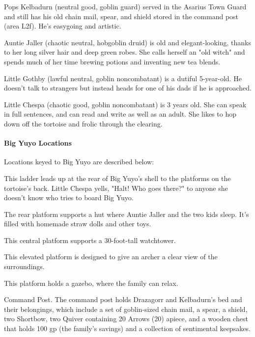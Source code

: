 \documentclass[10pt,a4paper,twoside,bg=print,twocolumn,openany,nodeprecatedcode]{dndbook}
\begin{document}
Pops Kelbadurn (neutral good, goblin guard) served in the Asarius Town Guard and still has his old chain mail, spear, and shield stored in the command post (area L2f). He's easygoing and artistic.

Auntie Jaller (chaotic neutral, hobgoblin druid) is old and elegant-looking, thanks to her long silver hair and deep green robes. She calls herself an "old witch" and spends much of her time brewing potions and inventing new tea blends.

Little Gothby (lawful neutral, goblin noncombatant) is a dutiful 5-year-old. He doesn't talk to strangers but instead heads for one of his dads if he is approached.

Little Chespa (chaotic good, goblin noncombatant) is 3 years old. She can speak in full sentences, and can read and write as well as an adult. She likes to hop down off the tortoise and frolic through the clearing.

\paragraph{Big Yuyo Locations}
Locations keyed to Big Yuyo are described below:


\begin{description}[nolistsep]
\item[L2a: Upladder.]
This ladder leads up at the rear of Big Yuyo's shell to the platforms on the tortoise's back. Little Chespa yells, "Halt! Who goes there?" to anyone she doesn't know who tries to board Big Yuyo.
\item[L2b: Rear Hut.]
The rear platform supports a hut where Auntie Jaller and the two kids sleep. It's filled with homemade straw dolls and other toys.
\item[L2c: Central Platform.]
This central platform supports a 30-foot-tall watchtower.
\item[L2d: Archery Tower.]
This elevated platform is designed to give an archer a clear view of the surroundings.
\item[L2e: Starboard Gazebo.]
This platform holds a gazebo, where the family can relax.
\item[L2f:]
Command Post. The command post holds Drazagorr and Kelbadurn's bed and their belongings, which include a set of goblin-sized chain mail, a spear, a shield, two Shortbow, two Quiver containing 20 Arrows (20) apiece, and a wooden chest that holds 100 gp (the family's savings) and a collection of sentimental keepsakes.
\end{description}
\end{document}
